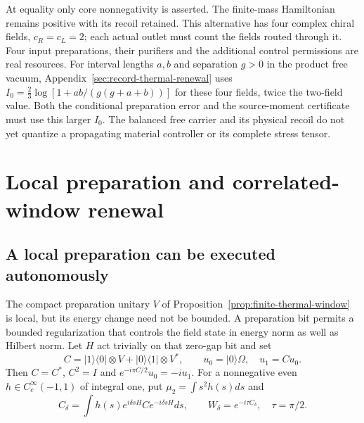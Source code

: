 At equality only core nonnegativity is asserted. The finite-mass
Hamiltonian remains positive with its recoil retained. This alternative
has four complex chiral fields, $c_R=c_L=2$; each actual outlet must
count the fields routed through it. Four input preparations, their
purifiers and the additional control permissions are real resources.
For interval lengths $a,b$ and separation $g>0$ in the product free vacuum,
Appendix~\ref{sec:record-thermal-renewal} uses
$I_0=\frac23\log[1+ab/(g(g+a+b))]$ for these four fields,
twice the two-field value. Both the conditional preparation error
and the source-moment certificate must use this larger $I_0$.
The balanced free carrier and its physical recoil do not yet quantize
a propagating material controller or its complete stress tensor.


\section{Local preparation and correlated-window renewal}
\label{app:thermal-window-proofs}

\subsection{A local preparation can be executed autonomously}
\label{sec:local-thermal-preparation}

The compact preparation unitary $V$ of
Proposition~\ref{prop:finite-thermal-window} is local, but its energy
change need not be bounded. A preparation bit permits a bounded
regularization that controls the field state in energy norm as well
as Hilbert norm. Let $H$ act trivially on that zero-gap bit and set
\[
 C=|1\rangle\langle0|\otimes V+
   |0\rangle\langle1|\otimes V^*,\qquad
 u_0=|0\rangle\Omega,\quad u_1=Cu_0.
\]
Then $C=C^*$, $C^2=I$ and $e^{-i\pi C/2}u_0=-iu_1$.
For a nonnegative even $h\in C_c^\infty(-1,1)$ of integral one,
put $\mu_2=\int s^2h(s)ds$ and
\[
 C_\delta=\int h(s)e^{i\delta sH}Ce^{-i\delta sH}ds,
 \qquad W_\delta=e^{-i\tau C_\delta},\quad\tau=\pi/2.
\]

